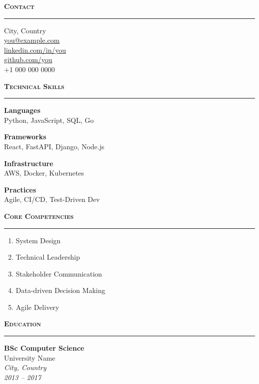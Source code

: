 \documentclass[10pt, a4paper]{article}
\newcommand{\sideheading}[1]{%
  \vspace{10pt}%
  {\small\textsc{\textbf{#1}}}\\[-2pt]%
  \rule{\linewidth}{0.3pt}%
  \vspace{4pt}%
}
\begin{document}
\noindent
\begin{minipage}[t]{0.30\textwidth}


  \sideheading{Contact}

  {\small
    City, Country \\
    \href{mailto:you@example.com}{you@example.com} \\
    \href{https://linkedin.com/in/yourprofile}{linkedin.com/in/you} \\
    \href{https://github.com/yourusername}{github.com/you} \\
    +1 000 000 0000
  }

  \sideheading{Technical Skills}

  {\small
    \textbf{Languages} \\
    Python, JavaScript, SQL, Go

    \vspace{5pt}
    \textbf{Frameworks} \\
    React, FastAPI, Django, Node.js

    \vspace{5pt}
    \textbf{Infrastructure} \\
    AWS, Docker, Kubernetes

    \vspace{5pt}
    \textbf{Practices} \\
    Agile, CI/CD, Test-Driven Dev
  }

  \sideheading{Core Competencies}

  \begin{enumerate}[leftmargin=*, itemsep=1pt, topsep=0pt,
                    label=\small\arabic*.]
    \small
    \item System Design
    \item Technical Leadership
    \item Stakeholder Communication
    \item Data-driven Decision Making
    \item Agile Delivery
  \end{enumerate}

  \sideheading{Education}

  {\small
    \textbf{BSc Computer Science} \\
    University Name \\
    \textit{City, Country} \\
    \textit{2013 -- 2017}
  }


\end{minipage}
\end{document}
